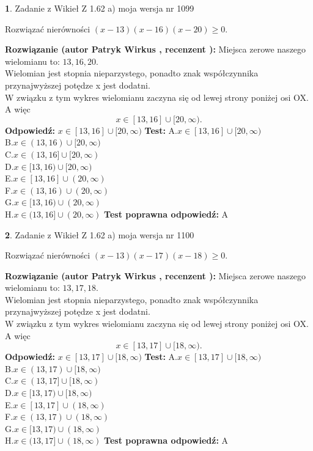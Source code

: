 \documentclass[12pt, a4paper]{article}
\theoremstyle{definition} %
\newtheorem{zad}{}
\newcommand{\zadStart}[1]{\begin{zad}#1\newline}
\newcommand{\zadStop}{\end{zad}}
\newcommand{\rozwStart}[2]{\noindent \textbf{Rozwiązanie (autor #1 , recenzent #2): }\newline}
\newcommand{\rozwStop}{\newline}
\newcommand{\odpStart}{\noindent \textbf{Odpowiedź:}\newline}
\newcommand{\odpStop}{\newline}
\newcommand{\testStart}{\noindent \textbf{Test:}\newline}
\newcommand{\testStop}{\newline}
\newcommand{\kluczStart}{\noindent \textbf{Test poprawna odpowiedź:}\newline}
\newcommand{\kluczStop}{\newline}
\begin{document}
\zadStart{Zadanie z Wikieł Z 1.62 a) moja wersja nr 1099}

Rozwiązać nierówności $(x-13)(x-16)(x-20)\ge0$.
\zadStop
\rozwStart{Patryk Wirkus}{}
Miejsca zerowe naszego wielomianu to: $13, 16, 20$.\\
Wielomian jest stopnia nieparzystego, ponadto znak współczynnika przy\linebreak najwyższej potędze x jest dodatni.\\ W związku z tym wykres wielomianu zaczyna się od lewej strony poniżej osi OX. A więc $$x \in [13,16] \cup [20,\infty).$$
\rozwStop
\odpStart
$x \in [13,16] \cup [20,\infty)$
\odpStop
\testStart
A.$x \in [13,16] \cup [20,\infty)$\\
B.$x \in (13,16) \cup [20,\infty)$\\
C.$x \in (13,16] \cup [20,\infty)$\\
D.$x \in [13,16) \cup [20,\infty)$\\
E.$x \in [13,16] \cup (20,\infty)$\\
F.$x \in (13,16) \cup (20,\infty)$\\
G.$x \in [13,16) \cup (20,\infty)$\\
H.$x \in (13,16] \cup (20,\infty)$
\testStop
\kluczStart
A
\kluczStop



\zadStart{Zadanie z Wikieł Z 1.62 a) moja wersja nr 1100}

Rozwiązać nierówności $(x-13)(x-17)(x-18)\ge0$.
\zadStop
\rozwStart{Patryk Wirkus}{}
Miejsca zerowe naszego wielomianu to: $13, 17, 18$.\\
Wielomian jest stopnia nieparzystego, ponadto znak współczynnika przy\linebreak najwyższej potędze x jest dodatni.\\ W związku z tym wykres wielomianu zaczyna się od lewej strony poniżej osi OX. A więc $$x \in [13,17] \cup [18,\infty).$$
\rozwStop
\odpStart
$x \in [13,17] \cup [18,\infty)$
\odpStop
\testStart
A.$x \in [13,17] \cup [18,\infty)$\\
B.$x \in (13,17) \cup [18,\infty)$\\
C.$x \in (13,17] \cup [18,\infty)$\\
D.$x \in [13,17) \cup [18,\infty)$\\
E.$x \in [13,17] \cup (18,\infty)$\\
F.$x \in (13,17) \cup (18,\infty)$\\
G.$x \in [13,17) \cup (18,\infty)$\\
H.$x \in (13,17] \cup (18,\infty)$
\testStop
\kluczStart
A
\kluczStop
\end{document}
